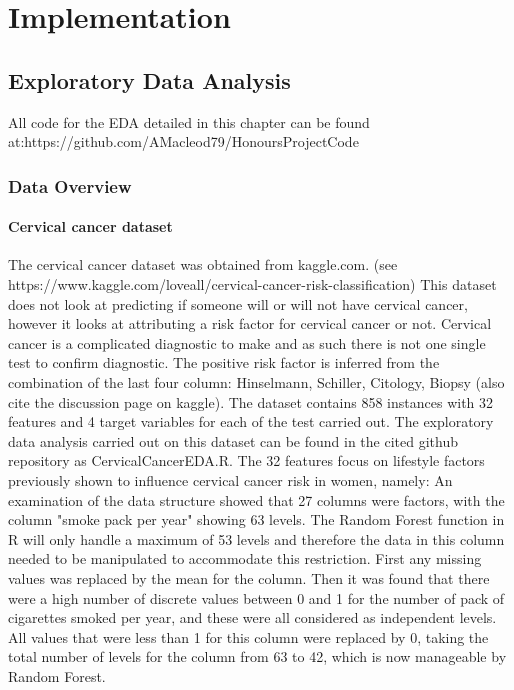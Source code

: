 \chapter{Implementation}\label{ch:Implementation}

\section{Exploratory Data Analysis}
All code for the EDA detailed in this chapter can be found at:\newline https://github.com/AMacleod79/HonoursProjectCode
\subsection{Data Overview}
\subsubsection{Cervical cancer dataset}
The cervical cancer dataset was obtained from kaggle.com. \newline
(see https://www.kaggle.com/loveall/cervical-cancer-risk-classification)\newline
This dataset does not look at predicting if someone will or will not have cervical cancer, however it looks at attributing a risk factor for cervical cancer or not. Cervical cancer is a complicated diagnostic to make and as such there is not one single test to confirm diagnostic. The positive risk factor is inferred from the combination of the last four column: Hinselmann, Schiller, Citology, Biopsy \cite{Fernandes:2017td} (also cite the discussion page on kaggle).
The dataset contains 858 instances with 32 features and 4 target variables for each of the test carried out.
The exploratory data analysis carried out on this dataset can be found in the cited github repository as CervicalCancerEDA.R.
The 32 features focus on lifestyle factors previously shown to influence cervical cancer risk in women, namely:
An examination of the data structure showed that 27 columns were factors, with the column "smoke pack per year" showing 63 levels. The Random Forest function in R will only handle a maximum of 53 levels and therefore the data in this column needed to be manipulated to accommodate this restriction. First any missing values was replaced by the mean for the column. Then it was found that there were a high number of discrete values between 0 and 1 for the number of pack of cigarettes smoked per year, and these were all considered as independent levels. All values that were less than 1 for this column were replaced by 0, taking the total number of levels for the column from 63 to 42, which is now manageable by Random Forest.
